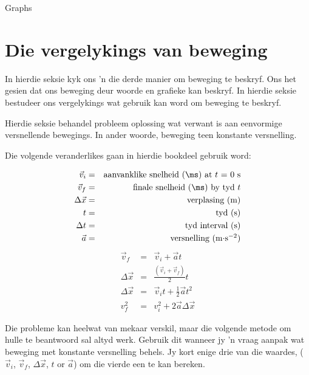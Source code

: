 \begin{exercises}{Graphs}
\end{exercises}


\section{Die vergelykings van beweging}
    \nopagebreak
      
In hierdie seksie kyk ons 'n die derde manier om beweging te beskryf. Ons het gesien dat ons beweging deur woorde en grafieke kan beskryf. In hierdie seksie bestudeer ons vergelykings wat gebruik kan word om beweging te beskryf.\par

Hierdie seksie behandel probleem oplossing wat verwant is aan eenvormige versnellende bewegings. In ander woorde, beweging teen konstante versnelling.

Die volgende veranderlikes gaan in hierdie bookdeel gebruik word:\par      
      
\label{m38796*id75611}\nopagebreak\noindent{}
\begin{eqnarray*}
\vec{v}_i &=& \mbox{aanvanklike snelheid (\ms) at $t$ = 0 s} \\
\vec{v}_f &=& \mbox{finale snelheid (\ms) by tyd $t$}\\
\Delta \vec{x} &=& \mbox{verplasing (m)} \\
t &=& \mbox{tyd (s)} \\
\Delta t &=& \mbox{tyd interval (s)} \\
\vec{a} &=& \mbox{versnelling (m$\cdot$s$^{-2}$)}
\end{eqnarray*}
      \label{m38796*eip-506}\nopagebreak\noindent{}
\begin{eqnarray}
\vec{v}_f &=& \vec{v}_i + \vec{a}t \label{eq:eq1}\\
\Delta \vec{x} &=& \frac{(\vec{v}_i + \vec{v}_f)}{2} t\label{eq:eq2}\\
\Delta \vec{x} &=& \vec{v}_it + \frac{1}{2}\vec{a}t^2 \label{eq:eq3}\\
v_f^2 &=& v_i^2 + 2\vec{a} \Delta \vec{x} \label{eq:eq4}
\end{eqnarray}

Die probleme kan heelwat van mekaar verskil, maar die volgende metode om hulle te beantwoord sal altyd werk. Gebruik dit wanneer jy 'n vraag aanpak wat beweging met konstante versnelling behels. Jy kort enige drie van die waardes, ($\vec{v}_{i}$, $\vec{v}_{f}$, $\Delta \vec{x}$, $t$ or $\vec{a}$) om die vierde een te kan bereken.\par


